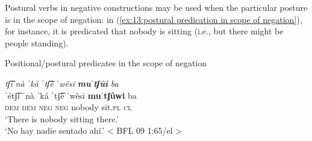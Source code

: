     \label{ex:13:postural verbs in negative polarity constructionsa}
        \label{ex:13:postural verbs in negative polarity constructionsb}
    \z
\z

Postural verbs in negative constructions may be used when the particular posture is in the scope of negation: in (\ref{ex:13:postural predication in scope of negation}), for instance, it is predicated that nobody is sitting (i.e., but there might be people standing).

\ea\label{ex:13:postural predication in scope of negation}
{Positional/postural predicates in the scope of negation}

    \textit{tʃ͡iˈnà    ˈká  ˈtʃ͡è    ˈwêsi} \textbf{\textit{muˈtʃûi}} \textit{ba}\\
    \gll    ˈétʃ͡i  ˈnà  ˈká  ˈtʃ͡è    ˈwêsi    \textbf{muˈtʃûwi}  ba\\
            \textsc{dem}  \textsc{dem}  \textsc{neg}  \textsc{neg} nobody  {sit.\textsc{pl} } \textsc{cl}\\
    \glt    ‘There is nobody sitting there.’\\
    \glt    ‘No hay nadie sentado ahí.’ < BFL 09 1:65/el >\\
\z

